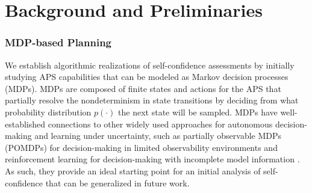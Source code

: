 \section{Background and Preliminaries} \label{sec:background}

\subsubsection{MDP-based Planning} \label{sec:mdp}

We establish algorithmic realizations of self-confidence assessments by initially studying APS capabilities that can be modeled as Markov decision processes (MDPs). MDPs are composed of finite states and actions for the APS that partially resolve the nondeterminism in state transitions by deciding from what probability distribution $p(\cdot)$ the next state will be sampled. %
MDPs have well-established connections to other widely used approaches for autonomous decision-making and learning under uncertainty, such as partially observable MDPs (POMDPs) for decision-making in limited observability environments and reinforcement learning for decision-making with incomplete model information \cite{Kochenderfer2015-uu}. As such, they provide an ideal starting point for an initial analysis of self-confidence that can be generalized in future work. 

